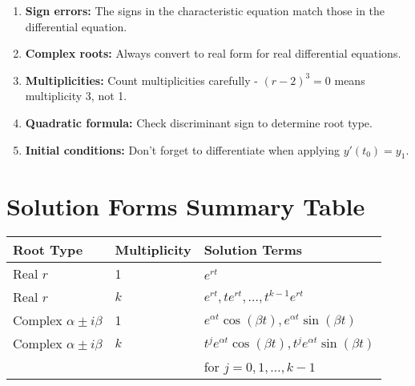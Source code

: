 \documentclass[12pt]{article}
\begin{document}
\begin{warning}
\begin{enumerate}
    \item \textbf{Sign errors:} The signs in the characteristic equation match those in the differential equation.
    \item \textbf{Complex roots:} Always convert to real form for real differential equations.
    \item \textbf{Multiplicities:} Count multiplicities carefully - $(r-2)^3 = 0$ means multiplicity 3, not 1.
    \item \textbf{Quadratic formula:} Check discriminant sign to determine root type.
    \item \textbf{Initial conditions:} Don't forget to differentiate when applying $y'(t_0) = y_1$.
\end{enumerate}
\end{warning}

\section{Solution Forms Summary Table}

\begin{center}
\begin{tabular}{|l|l|l|}
\hline
\textbf{Root Type} & \textbf{Multiplicity} & \textbf{Solution Terms} \\
\hline
Real $r$ & 1 & $e^{rt}$ \\
\hline
Real $r$ & $k$ & $e^{rt}, te^{rt}, \ldots, t^{k-1}e^{rt}$ \\
\hline
Complex $\alpha \pm i\beta$ & 1 & $e^{\alpha t}\cos(\beta t), e^{\alpha t}\sin(\beta t)$ \\
\hline
Complex $\alpha \pm i\beta$ & $k$ & $t^j e^{\alpha t}\cos(\beta t), t^j e^{\alpha t}\sin(\beta t)$ \\
& & for $j = 0, 1, \ldots, k-1$ \\
\hline
\end{tabular}
\end{center}
\end{document}
